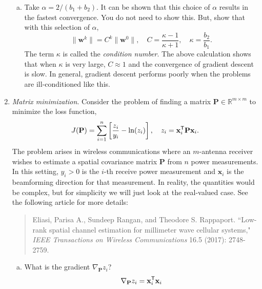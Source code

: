 \documentclass[11pt]{article}
\def\R{{\mathbb{R}}}
\def\x{\times}
\newcommand{\wbf}{\mathbf{w}}
\newcommand{\xbf}{\mathbf{x}}
\newcommand{\Pbf}{\mathbf{P}}
\newcommand{\tran}{^{\text{\sf T}}}
\begin{document}
\begin{enumerate}
\begin{enumerate}[(a)]
\item Take $\alpha = 2/(b_1+b_2)$.  It can be shown that this choice of $\alpha$ results in the fastest convergence.  You do not need to show this.
But, show that with this selection of $\alpha$,
\[
    \|\wbf^k\| = C^k \|\wbf^0\|, \quad C = \frac{\kappa-1}{\kappa+1 }, \quad
    \kappa = \frac{b_2}{b_1}.
\]
The term $\kappa$ is called the \emph{condition number}.  The above calculation
shows that when $\kappa$ is very large, $C \approx 1$ and the convergence
of gradient descent is slow.  In general, gradient descent performs poorly
when the problems are ill-conditioned like this.
\end{enumerate}

\item \emph{Matrix minimization}.  Consider the problem of finding a matrix
$\Pbf \in \R^{m \x m}$ to minimize the loss function,
\[
    J(\Pbf) = \sum_{i=1}^n \left[ \frac{z_i}{y_i} - \ln(z_i) \right],
    \quad
    z_i = \xbf_i\tran \Pbf \xbf_i.
\]
The problem arises in wireless communications where an $m$-antenna receiver wishes
to estimate a spatial covariance matrix $\Pbf$ from $n$ power measurements.
In this setting, $y_i > 0$ is the $i$-th receive power measurement and $\xbf_i$
is the beamforming direction for that measurement.  In reality, the quantities
would be complex, but for simplicity we will just look at the real-valued case.
See the following article for more details:
\begin{quote}
  Eliasi, Parisa A., Sundeep Rangan, and Theodore S. Rappaport. ``Low-rank spatial channel estimation for millimeter wave cellular systems," \emph{IEEE Transactions on Wireless Communications} 16.5 (2017): 2748-2759.
\end{quote}
\begin{enumerate}[(a)]
\item What is the gradient $\nabla_{\Pbf} z_i$?
\[
	\nabla_{\Pbf} z_i = \xbf_i\tran \xbf_i
\]


\end{enumerate}
\end{enumerate}
\end{document}
